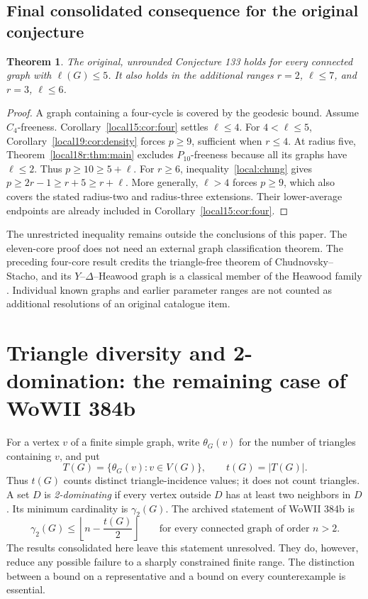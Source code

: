 \documentclass[11pt,a4paper]{article}
\newtheorem{theorem}{Theorem}[section]
\theoremstyle{definition}\newtheorem{definition}[theorem]{Definition}
\theoremstyle{remark}\newtheorem{remark}[theorem]{Remark}
\newcommand{\floor}[1]{\left\lfloor#1\right\rfloor}
\begin{document}
\subsection{Final consolidated consequence for the original conjecture}
\begin{theorem}\label{local:final}
The original, unrounded Conjecture 133 holds for every connected graph
with $\ell(G)\le5$.
It also holds in the additional ranges $r=2$, $\ell\le7$, and
$r=3$, $\ell\le6$.
\end{theorem}
\begin{proof}
A graph containing a four-cycle is covered by the geodesic bound.
Assume $C_4$-freeness. Corollary~\ref{local15:cor:four} settles
$\ell\le4$. For $4<\ell\le5$, Corollary~\ref{local19:cor:density}
forces $p\ge9$, sufficient when $r\le4$. At radius five,
Theorem~\ref{local18r:thm:main} excludes $P_{10}$-freeness because all
its graphs have $\ell\le2$. Thus $p\ge10\ge5+\ell$.
For $r\ge6$, inequality~\eqref{local:chung} gives
$p\ge2r-1\ge r+5\ge r+\ell$.
More generally, $\ell>4$ forces $p\ge9$, which also covers the stated
radius-two and radius-three extensions. Their lower-average endpoints
are already included in Corollary~\ref{local15:cor:four}.
\end{proof}
The unrestricted inequality remains outside the conclusions of this
paper. The eleven-core proof does not need an external graph
classification theorem. The preceding four-core result credits the
triangle-free theorem of Chudnovsky--Stacho, and its $Y$--$\Delta$--Heawood
graph is a classical member of the Heawood family
\cite{src:cs,src:heawoodfamily}. Individual known graphs and earlier
parameter ranges are not counted as additional resolutions of an
original catalogue item.


\section{Triangle diversity and 2-domination: the remaining case of WoWII 384b}
\label{paired:section}

For a vertex $v$ of a finite simple graph, write $\theta_G(v)$ for the
number of triangles containing $v$, and put
\[
 T(G)=\{\theta_G(v):v\in V(G)\},\qquad t(G)=|T(G)|.
\]
Thus $t(G)$ counts distinct triangle-incidence values; it does not count
triangles. A set $D$ is \emph{2-dominating} if every vertex outside $D$
has at least two neighbors in $D$. Its minimum cardinality is
$\gamma_2(G)$. The archived statement of WoWII 384b is
\begin{equation}\label{paired:target}
 \gamma_2(G)\le\floor{n-\frac{t(G)}2}
 \qquad\text{for every connected graph of order }n>2.
\end{equation}
The results consolidated here leave this statement unresolved. They do,
however, reduce any possible failure to a sharply constrained finite
range. The distinction between a bound on a representative and a bound
on every counterexample is essential.
\end{document}
